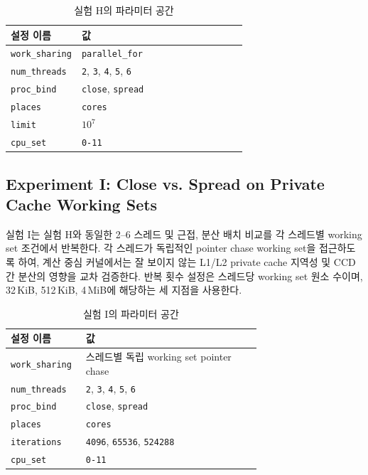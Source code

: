\documentclass[11pt,a4paper]{article}
\begin{document}
\begin{table}[h]
\centering
\begin{tabular}{lp{0.70\linewidth}}
\toprule
설정 이름 & 값 \\
\midrule
\texttt{work\_sharing} & \texttt{parallel\_for} \\
\texttt{num\_threads} & \texttt{2}, \texttt{3}, \texttt{4}, \texttt{5}, \texttt{6} \\
\texttt{proc\_bind} & \texttt{close}, \texttt{spread} \\
\texttt{places} & \texttt{cores} \\
\texttt{limit} & $10^7$ \\
\texttt{cpu\_set} & \texttt{0-11} \\
\bottomrule
\end{tabular}
\caption{실험 H의 파라미터 공간}
\label{tab:expH-space}
\end{table}

\subsection{Experiment I: Close vs. Spread on Private Cache Working Sets}

실험 I는 실험 H와 동일한 2--6 스레드 및 근접, 분산 배치 비교를 각 스레드별 working set 조건에서 반복한다. 각 스레드가 독립적인 pointer chase working set을 접근하도록 하여, 계산 중심 커널에서는 잘 보이지 않는 L1/L2 private cache 지역성 및 CCD 간 분산의 영향을 교차 검증한다. 반복 횟수 설정은 스레드당 working set 원소 수이며, 32\,KiB, 512\,KiB, 4\,MiB에 해당하는 세 지점을 사용한다.

\begin{table}[h]
\centering
\begin{tabular}{lp{0.70\linewidth}}
\toprule
설정 이름 & 값 \\
\midrule
\texttt{work\_sharing} & 스레드별 독립 working set pointer chase \\
\texttt{num\_threads} & \texttt{2}, \texttt{3}, \texttt{4}, \texttt{5}, \texttt{6} \\
\texttt{proc\_bind} & \texttt{close}, \texttt{spread} \\
\texttt{places} & \texttt{cores} \\
\texttt{iterations} & \texttt{4096}, \texttt{65536}, \texttt{524288} \\
\texttt{cpu\_set} & \texttt{0-11} \\
\bottomrule
\end{tabular}
\caption{실험 I의 파라미터 공간}
\label{tab:expI-space}
\end{table}
\end{document}
